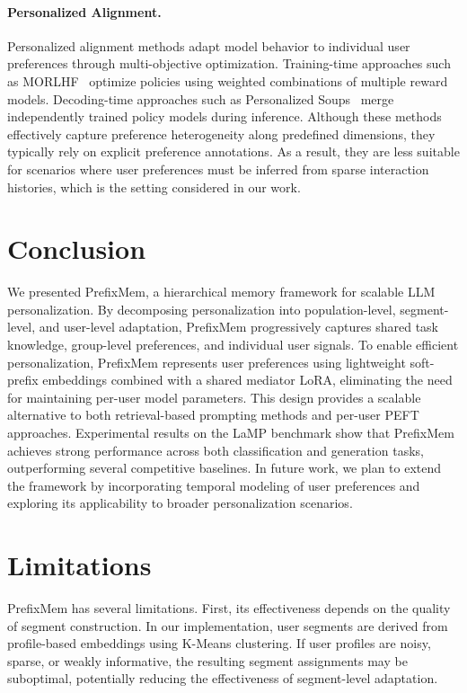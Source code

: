 \documentclass[11pt]{article}
\begin{document}
\paragraph{Personalized Alignment.}
Personalized alignment methods adapt model behavior to individual user preferences through multi-objective optimization. Training-time approaches such as MORLHF~\cite{wu2023morlhf} optimize policies using weighted combinations of multiple reward models. Decoding-time approaches such as Personalized Soups~\cite{jang2023personalized} merge independently trained policy models during inference. Although these methods effectively capture preference heterogeneity along predefined dimensions, they typically rely on explicit preference annotations. As a result, they are less suitable for scenarios where user preferences must be inferred from sparse interaction histories, which is the setting considered in our work.

\section{Conclusion}

We presented PrefixMem, a hierarchical memory framework for scalable LLM personalization. By decomposing personalization into population-level, segment-level, and user-level adaptation, PrefixMem progressively captures shared task knowledge, group-level preferences, and individual user signals. To enable efficient personalization, PrefixMem represents user preferences using lightweight soft-prefix embeddings combined with a shared mediator LoRA, eliminating the need for maintaining per-user model parameters. This design provides a scalable alternative to both retrieval-based prompting methods and per-user PEFT approaches. Experimental results on the LaMP benchmark show that PrefixMem achieves strong performance across both classification and generation tasks, outperforming several competitive baselines. In future work, we plan to extend the framework by incorporating temporal modeling of user preferences and exploring its applicability to broader personalization scenarios.

\section*{Limitations}

PrefixMem has several limitations. First, its effectiveness depends on the quality of segment construction. In our implementation, user segments are derived from profile-based embeddings using K-Means clustering. If user profiles are noisy, sparse, or weakly informative, the resulting segment assignments may be suboptimal, potentially reducing the effectiveness of segment-level adaptation.
\end{document}
